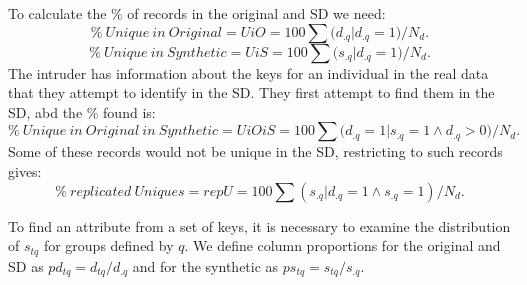 \documentclass[12pt]{article}
\begin{document}
 To calculate the \% of records in the original and SD we need:
  \begin{equation}
\%~Unique~in~Original = UiO = 100\sum{(d_{.q} |d_{.q} = 1})/N_d. 
  \end{equation}
  \begin{equation}
  \%~Unique~in~Synthetic = UiS = 100\sum{(s_{.q} |d_{.q} = 1})/N_d.
    \end{equation}
    The intruder has information about the keys for an individual in the real data that they attempt to identify in the SD. They first attempt to find them in the SD, abd  the \% found is:
      \begin{equation}
    \%~Unique~in~Original~in~Synthetic = UiOiS = 100 \sum{(d_{.q} = 1 |s_{.q} = 1 \land d_{.q} > 0})/N_d.
      \end{equation}
      Some of these records would not be unique in the SD, restricting to such records gives:
        \begin{equation}
      \%~replicated~Uniques = repU = 100\sum{(s_{.q} |d_{.q} = 1 \land s_{.q} = 1)}/N_d.
      \end{equation}
      
      To find an attribute from a set of keys, it is necessary to examine the distribution of $s_{tq}$ for groups defined by $q$. We define column proportions for the original and SD as $pd_{tq} = d_{tq}/d_{.q}$ and for the synthetic as $ps_{tq} = s_{tq}/s_{.q}$.
     
\end{document}
